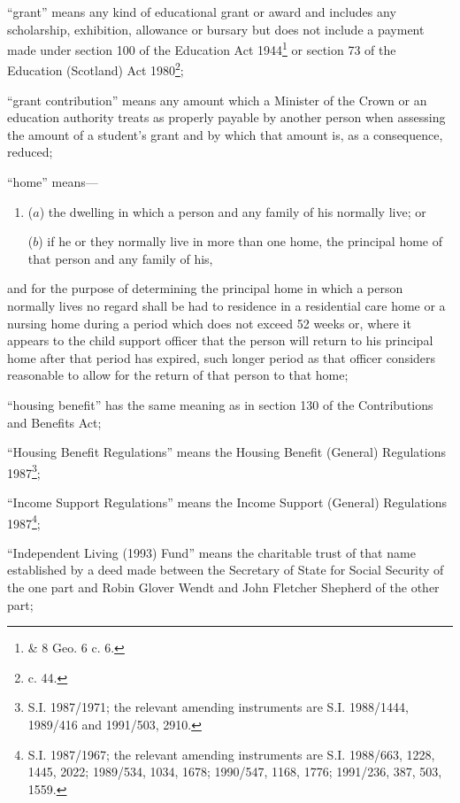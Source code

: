 \documentclass[12pt,a4paper]{article}
\begin{document}
\begin{enumerate}
“grant” means any kind of educational grant or award and includes any scholarship, exhibition, allowance or bursary but does not include a payment made under section 100 of the Education Act 1944\footnote{ \& 8 Geo. 6 c. 6.} or section 73 of the Education (Scotland) Act 1980\footnote{ c. 44.};

“grant contribution” means any amount which a Minister of the Crown or an education authority treats as properly payable by another person when assessing the amount of a student’s grant and by which that amount is, as a consequence, reduced;

“home” means—
\begin{enumerate}\item[]
($a$)
the dwelling in which a person and any family of his normally live; or

($b$)
if he or they normally live in more than one home, the principal home of that person and any family of his,
\end{enumerate}
and for the purpose of determining the principal home in which a person normally lives no regard shall be had to residence in a residential care home or a nursing home during a period which does not exceed 52 weeks or, where it appears to the child support officer that the person will return to his principal home after that period has expired, such longer period as that officer considers reasonable to allow for the return of that person to that home;

“housing benefit” has the same meaning as in section 130 of the Contributions and Benefits Act;

“Housing Benefit Regulations” means the Housing Benefit (General) Regulations 1987\footnote{\frenchspacing S.I. 1987/1971; the relevant amending instruments are S.I. 1988/1444, 1989/416 and 1991/503, 2910.};

“Income Support Regulations” means the Income Support (General) Regulations 1987\footnote{\frenchspacing S.I. 1987/1967; the relevant amending instruments are S.I. 1988/663, 1228, 1445, 2022; 1989/534, 1034, 1678; 1990/547, 1168, 1776; 1991/236, 387, 503, 1559.};

“Independent Living (1993) Fund” means the charitable trust of that name established by a deed made between the Secretary of State for Social Security of the one part and Robin Glover Wendt and John Fletcher Shepherd of the other part;


\end{enumerate}
\end{document}
